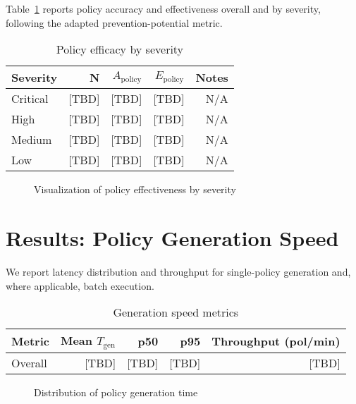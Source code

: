 Table~\ref{tab:efficacy-by-severity} reports policy accuracy and effectiveness overall and by severity, following the adapted prevention-potential metric.

\begin{table}[htbp]
	\centering
		\caption{Policy efficacy by severity}\label{tab:efficacy-by-severity}
	\begin{tabular}{lrrrr}
		\hline
		Severity & N & $A_{\text{policy}}$ & $E_{\text{policy}}$ & Notes \\
		\hline
		Critical & [TBD] & [TBD] & [TBD] & N/A \\
		High & [TBD] & [TBD] & [TBD] & N/A \\
		Medium & [TBD] & [TBD] & [TBD] & N/A \\
		Low & [TBD] & [TBD] & [TBD] & N/A \\
		\hline
	\end{tabular}
\end{table}

\begin{figure}[htbp]
	\centering
		\caption{Visualization of policy effectiveness by severity}\label{fig:efficacy-plot}
\end{figure}

\section{Results: Policy Generation Speed}\label{sec:results-speed}

We report latency distribution and throughput for single-policy generation and, where applicable, batch execution.

\begin{table}[htbp]
	\centering
		\caption{Generation speed metrics}\label{tab:speed-metrics}
	\begin{tabular}{lrrrr}
		\hline
		Metric & Mean $T_{\text{gen}}$ & p50 & p95 & Throughput (pol/min) \\
		\hline
		Overall & [TBD] & [TBD] & [TBD] & [TBD] \\
		\hline
	\end{tabular}
\end{table}

\begin{figure}[htbp]
	\centering
		\caption{Distribution of policy generation time}\label{fig:speed-distribution}
\end{figure}

